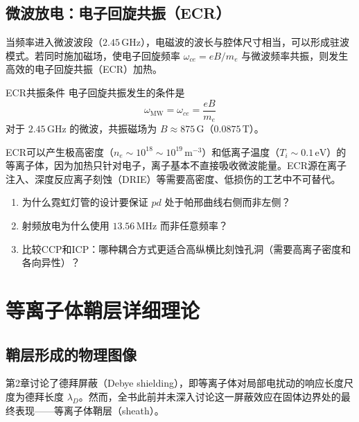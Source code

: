 \subsection{微波放电：电子回旋共振（ECR）}

当频率进入微波波段（$2.45\,\mathrm{GHz}$），电磁波的波长与腔体尺寸相当，可以形成驻波模式。若同时施加磁场，使电子回旋频率 $\omega_{ce} = eB/m_e$ 与微波频率共振，则发生高效的电子回旋共振（ECR）加热。

\begin{theorem}{ECR共振条件}{}{}
\label{thm:ecr-condition}
电子回旋共振发生的条件是
\begin{equation}
\label{eq:ecr-condition}
\omega_{\text{MW}} = \omega_{ce} = \frac{eB}{m_e}
\end{equation}
对于 $2.45\,\mathrm{GHz}$ 的微波，共振磁场为 $B \approx 875\,\mathrm{G}$（$0.0875\,\mathrm{T}$）。
\end{theorem}

\begin{insight}{}{}
ECR可以产生极高密度（$n_e \sim 10^{18}\sim 10^{19}\,\mathrm{m^{-3}}$）和低离子温度（$T_i \sim 0.1\,\mathrm{eV}$）的等离子体，因为加热只针对电子，离子基本不直接吸收微波能量。ECR源在离子注入、深度反应离子刻蚀（DRIE）等需要高密度、低损伤的工艺中不可替代。
\end{insight}

\begin{miniquiz}
\begin{enumerate}
\item 为什么霓虹灯管的设计要保证 $pd$ 处于帕邢曲线右侧而非左侧？
\item 射频放电为什么使用 $13.56\,\mathrm{MHz}$ 而非任意频率？
\item 比较CCP和ICP：哪种耦合方式更适合高纵横比刻蚀孔洞（需要高离子密度和各向异性）？
\end{enumerate}
\end{miniquiz}

\section{等离子体鞘层详细理论}

\subsection{鞘层形成的物理图像}

第2章讨论了德拜屏蔽（Debye shielding），即等离子体对局部电扰动的响应长度尺度为德拜长度 $\lambda_D$。然而，全书此前并未深入讨论这一屏蔽效应在固体边界处的最终表现——等离子体鞘层（sheath）。

